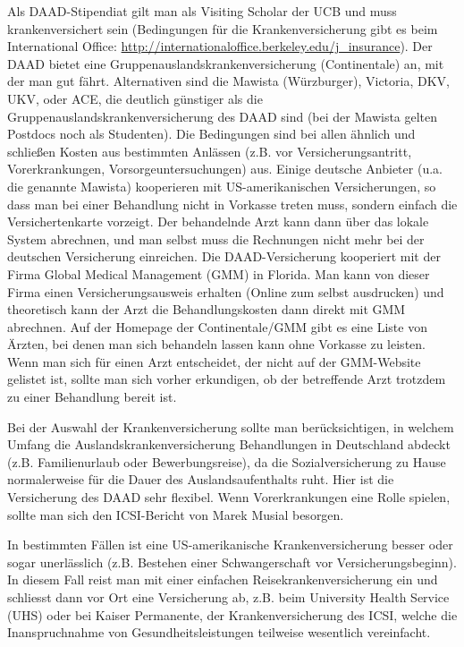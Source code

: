 \documentclass[a4paper]{scrreprt}
\begin{document}
Als DAAD-Stipendiat gilt man als Visiting Scholar der UCB und muss krankenversichert sein (Bedingungen für die Krankenversicherung gibt es beim International Office:  \url{http://internationaloffice.berkeley.edu/j\_insurance}). Der DAAD bietet eine Gruppenauslandskrankenversicherung (Continentale) an, mit der man gut fährt. Alternativen sind die Mawista (Würzburger), Victoria, DKV, UKV, oder ACE, die deutlich günstiger als die Gruppenauslandskrankenversicherung des DAAD sind (bei der Mawista gelten Postdocs noch als Studenten). Die Bedingungen sind bei allen ähnlich und schließen Kosten aus bestimmten Anlässen (z.B. vor Versicherungsantritt, Vorerkrankungen, Vorsorgeuntersuchungen) aus. Einige deutsche Anbieter (u.a. die genannte Mawista) kooperieren mit US-amerikanischen Versicherungen, so dass man bei einer Behandlung nicht in Vorkasse treten muss, sondern einfach die Versichertenkarte vorzeigt. Der behandelnde Arzt kann dann über das lokale System abrechnen, und man selbst muss die Rechnungen nicht mehr bei der deutschen Versicherung einreichen. Die DAAD-Versicherung kooperiert mit der Firma Global Medical Management (GMM) in Florida. Man kann von dieser Firma einen Versicherungsausweis erhalten (Online zum selbst ausdrucken) und theoretisch kann der Arzt die Behandlungskosten dann direkt mit GMM abrechnen. Auf der Homepage der Continentale/GMM gibt es eine Liste von Ärzten, bei denen man sich behandeln lassen kann ohne Vorkasse zu leisten.
Wenn man sich für einen Arzt entscheidet, der nicht auf der GMM-Website gelistet ist, sollte man sich vorher erkundigen, ob der betreffende Arzt trotzdem zu einer Behandlung bereit ist.

Bei der Auswahl der Krankenversicherung sollte man berücksichtigen, in welchem Umfang die Auslandskrankenversicherung Behandlungen in Deutschland abdeckt (z.B. Familienurlaub oder Bewerbungsreise), da die Sozialversicherung zu Hause normalerweise für die Dauer des Auslandsaufenthalts ruht. Hier ist die Versicherung des DAAD sehr flexibel. Wenn Vorerkrankungen eine Rolle spielen, sollte man sich den ICSI-Bericht von Marek Musial besorgen.

In bestimmten Fällen ist eine US-amerikanische Krankenversicherung besser oder sogar unerlässlich (z.B. Bestehen einer Schwangerschaft vor Versicherungsbeginn). In diesem Fall reist man mit einer einfachen Reisekrankenversicherung ein und schliesst dann vor Ort eine Versicherung ab, z.B. beim University Health Service (UHS) oder bei Kaiser Permanente, der Krankenversicherung des ICSI, welche die Inanspruchnahme von Gesundheitsleistungen teilweise wesentlich vereinfacht.
\end{document}
